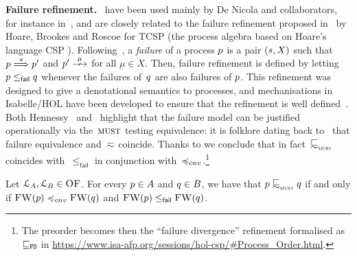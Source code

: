 \newcommand{\failleq}{\mathrel{\leq_{\textsf{fail}}}}

{\bfseries Failure refinement.} %
\MustSets\ have been used mainly
by De Nicola and collaborators, for instance
in~\cite{DBLP:journals/lmcs/NicolaM23,DBLP:journals/iandc/BorealeNP02},
and are closely related to the failure refinement proposed
in~\cite{DBLP:journals/jacm/BrookesHR84} by Hoare, Brookes and Roscoe for TCSP (the process
algebra based on Hoare's language CSP
\cite{DBLP:journals/cacm/Hoare83a,DBLP:conf/icalp/Brookes83}).
Following~\cite{DBLP:journals/jacm/BrookesHR84},  
a {\em failure} of a process $p$ is a pair $(s, X)$
such that $p \mathrel{\overset{ s } \Longrightarrow} p'$ and $p' \Nst{\mu}$ for all $\mu \in X$.
Then, failure refinement is defined by letting $\serverA\failleq\serverB$
whenever the failures of~$q$ are also failures of $p$.
This refinement was designed to give a denotational semantics to
processes, and mechanisations in Isabelle/HOL have been
developed to ensure that the refinement
is well defined~\cite{HOL-CSP-AFP,DBLP:journals/acta/BaxterRC22}.  Both
Hennessy~\cite[pag. 260]{DBLP:books/daglib/0066919}
and~\cite{Castellan2023}
highlight that the failure
  model can be justified operationally via the~$\operatorname{\textsc{must}}$ testing
  equivalence: it is folklore dating back to~\cite[Section
    4]{DBLP:journals/tcs/NicolaH84} that failure equivalence and~$\mathrel{\eqsim_{\text{}}}$ coincide.
  Thanks to  we
  conclude that in fact~$\testleqS$ 
  coincides with~$\failleq$ in conjunction with~$\bhvleqone$.\footnote{The preorder becomes 
  then the ``failure divergence'' refinement formalised as
  $\sqsubseteq_{\text{\tt FD}}$ in \url{https://www.isa-afp.org/sessions/hol-csp/\#Process\_Order.html}.}

  
\begin{corollary}
  \label{cor:testleqS-equals-failleq}
  Let $\mathcal{L}_A, \mathcal{L}_B \in \textsc{OF}$.
  For every $p \in A$  and
  $q \in B $, we have that
  $\serverA \testleqS \serverB$ if and only if
  $\liftFW{\serverA} \bhvleqone \liftFW{\serverB}$
  and $\liftFW{\serverA} \failleq \liftFW{\serverB}$.
\end{corollary}


